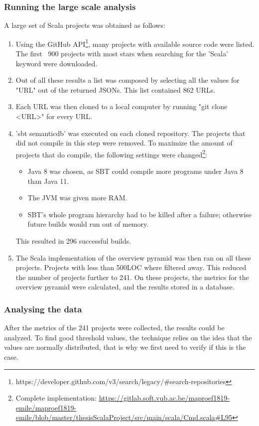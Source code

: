 \documentclass[onecolumn]{article}
\begin{document}
\subsubsection{Running the large scale analysis} \label{running_large_scala_analysis}
A large set of Scala projects was obtained as follows:
\begin{enumerate}
    \item Using the GitHub API\footnote{https://developer.github.com/v3/search/legacy/\#search-repositories}, many projects with available source code were listed. The first ~900 projects with most stars when searching for the 'Scala' keyword were downloaded.
    \item Out of all these results a list was composed by selecting all the values for "URL" out of the returned JSONs. This list contained 862 URLs.
    \item Each URL was then cloned to a local computer by running "git clone <URL>" for every URL.
    \item 'sbt semanticdb' was executed on each cloned repository. The projects that did not compile in this step were removed. To maximize the amount of projects that do compile, the following settings were changed\footnote{Complete implementation: \url{https://gitlab.soft.vub.ac.be/maproef1819-emile/maproef1819-emile/blob/master/thesisScalaProject/src/main/scala/Cmd.scala\#L95}}:
    \begin{itemize}
        \item Java 8 was chosen, as SBT could compile more programs under Java 8 than Java 11.
        \item The JVM was given more RAM.
        \item SBT's whole program hierarchy had to be killed after a failure; otherwise future builds would run out of memory.
    \end{itemize}
    This resulted in 296 successful builds.
    \item The Scala implementation of the overview pyramid was then ran on all these projects. Projects with less than 500LOC where filtered away.
    This reduced the number of projects further to 241. On these projects, the metrics for the overview pyramid were calculated, and the results stored in a database.
\end{enumerate}


\subsubsection{Analysing the data}
After the metrics of the 241 projects were collected, the results could be analyzed. To find good threshold values, the technique relies on the idea that the values are normally distributed, that is why we first need to verify if this is the case. 
\end{document}
